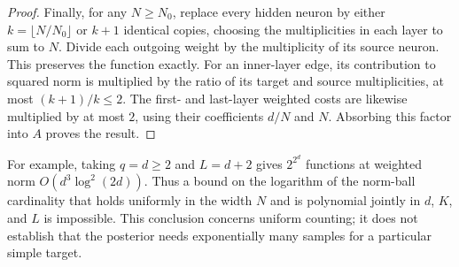 \begin{proof}
Finally, for any $N\geq N_0$, replace every hidden neuron by either
$k=\lfloor N/N_0\rfloor$ or $k+1$ identical copies, choosing the
multiplicities in each layer to sum to $N$.  Divide each outgoing weight
by the multiplicity of its source neuron.  This preserves the function
exactly.  For an inner-layer edge, its contribution to squared norm is
multiplied by the ratio of its target and source multiplicities, at most
$(k+1)/k\leq2$.  The first- and last-layer weighted costs are likewise
multiplied by at most $2$, using their coefficients $d/N$ and $N$.
Absorbing this factor into $A$ proves the result.
\end{proof}

For example, taking $q=d\geq2$ and $L=d+2$ gives $2^{2^d}$ functions at weighted
norm $O(d^3\log^2(2d))$.  Thus a bound on the logarithm of the norm-ball
cardinality that holds uniformly in the width $N$ and is polynomial jointly
in $d$, $K$, and $L$ is impossible.
This conclusion concerns uniform counting; it does not establish that the
posterior needs exponentially many samples for a particular simple target.
